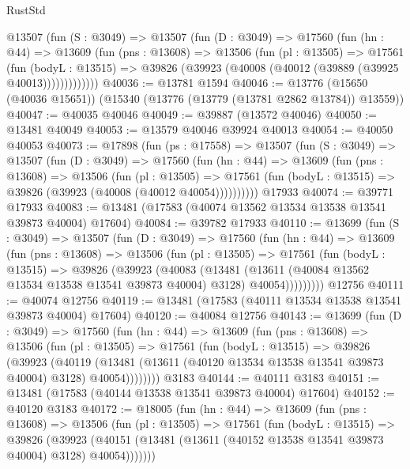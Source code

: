 \begin{lexlean}{RustStd}
\begin{coremodule}
      @13507
        (fun (S : @3049) =>
        @13507
          (fun (D : @3049) =>
          @17560
            (fun (hn : @44) =>
            @13609
              (fun (pns : @13608) =>
              @13506
                (fun (pl : @13505) =>
                @17561
                  (fun (bodyL : @13515) =>
                  @39826 (@39923 (@40008 (@40012 (@39889 (@39925 @40013)))))))))))))
@40036 := @13781 @1594
@40046 := @13776 (@15650 (@40036 @15651)) (@15340 (@13776 (@13779 (@13781 @2862 @13784)) @13559))
@40047 := @40035 @40046
@40049 := @39887 (@13572 @40046)
@40050 := @13481 @40049
@40053 := @13579 @40046 @39924 @40013
@40054 := @40050 @40053
@40073 := @17898
    (fun (ps : @17558) =>
    @13507
      (fun (S : @3049) =>
      @13507
        (fun (D : @3049) =>
        @17560
          (fun (hn : @44) =>
          @13609
            (fun (pns : @13608) =>
            @13506
              (fun (pl : @13505) =>
              @17561 (fun (bodyL : @13515) => @39826 (@39923 (@40008 (@40012 @40054))))))))))
    @17933
@40074 := @39771 @17933
@40083 := @13481 (@17583 (@40074 @13562 @13534 @13538 @13541 @39873 @40004) @17604)
@40084 := @39782 @17933
@40110 := @13699
    (fun (S : @3049) =>
    @13507
      (fun (D : @3049) =>
      @17560
        (fun (hn : @44) =>
        @13609
          (fun (pns : @13608) =>
          @13506
            (fun (pl : @13505) =>
            @17561
              (fun (bodyL : @13515) =>
              @39826
                (@39923
                  (@40083
                    (@13481
                      (@13611 (@40084 @13562 @13534 @13538 @13541 @39873 @40004) @3128)
                      @40054)))))))))
    @12756
@40111 := @40074 @12756
@40119 := @13481 (@17583 (@40111 @13534 @13538 @13541 @39873 @40004) @17604)
@40120 := @40084 @12756
@40143 := @13699
    (fun (D : @3049) =>
    @17560
      (fun (hn : @44) =>
      @13609
        (fun (pns : @13608) =>
        @13506
          (fun (pl : @13505) =>
          @17561
            (fun (bodyL : @13515) =>
            @39826
              (@39923
                (@40119
                  (@13481 (@13611 (@40120 @13534 @13538 @13541 @39873 @40004) @3128) @40054))))))))
    @3183
@40144 := @40111 @3183
@40151 := @13481 (@17583 (@40144 @13538 @13541 @39873 @40004) @17604)
@40152 := @40120 @3183
@40172 := @18005
    (fun (hn : @44) =>
    @13609
      (fun (pns : @13608) =>
      @13506
        (fun (pl : @13505) =>
        @17561
          (fun (bodyL : @13515) =>
          @39826
            (@39923
              (@40151 (@13481 (@13611 (@40152 @13538 @13541 @39873 @40004) @3128) @40054)))))))

\end{coremodule}
\end{lexlean}
